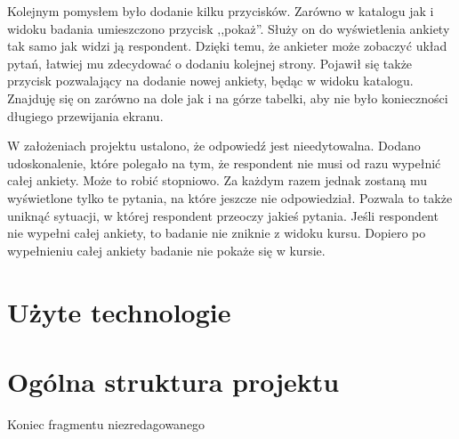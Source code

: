 Kolejnym pomysłem było dodanie kilku przycisków. Zarówno w katalogu jak i widoku badania umieszczono przycisk ,,pokaż''. Służy on do wyświetlenia ankiety tak samo jak widzi ją respondent. Dzięki temu, że ankieter może zobaczyć układ pytań, łatwiej mu zdecydować o dodaniu kolejnej strony. Pojawił się także przycisk pozwalający na dodanie nowej ankiety, będąc w widoku katalogu. Znajduję się on zarówno na dole jak i na górze tabelki, aby nie było konieczności długiego przewijania ekranu.

W założeniach projektu ustalono, że odpowiedź jest nieedytowalna. Dodano udoskonalenie, które polegało na tym, że respondent nie musi od razu wypełnić całej ankiety. Może to robić stopniowo. Za każdym razem jednak zostaną mu wyświetlone tylko te pytania, na które jeszcze nie odpowiedział. Pozwala to także uniknąć sytuacji, w której respondent przeoczy jakieś pytania. Jeśli respondent nie wypełni całej ankiety, to badanie nie zniknie z widoku kursu. Dopiero po wypełnieniu całej ankiety badanie nie pokaże się w kursie.


%

\section{Użyte technologie}
\label{Chapter63}




\section{Ogólna struktura projektu}
\label{Chapter64}











{\color{red}Koniec fragmentu niezredagowanego}
